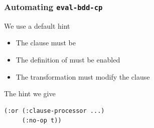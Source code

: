 \begin{frame}[fragile]
\frametitle{Automating {\tt eval-bdd-cp}}

We use a default hint

\begin{itemize}
\item The clause must be 
\item The definition of  must be enabled
\item The transformation must modify the clause
\end{itemize}

\SmallSkip
The hint we give
\begin{verbatim}
(:or (:clause-processor ...)
     (:no-op t))
\end{verbatim}

\end{frame}
